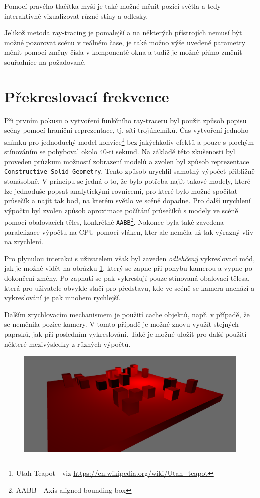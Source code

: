 \documentclass[12pt,a4paper,titlepage,final]{report}
\begin{document}
Pomocí pravého tlačítka myši je také možné měnit pozici světla a tedy interaktivně vizualizovat různé stíny a odlesky.

Jelikož metoda ray-tracing je pomalejší a na některých přístrojích nemusí být možné pozorovat scénu v reálném čase, je také možno výše uvedené parametry měnit pomocí změny čísla v komponentě okna a tudíž je možné přímo změnit souřadnice na požadované.

\section{Překreslovací frekvence}
\label{prvni_pokus}
Při prvním pokusu o vytvoření funkčního ray-traceru byl použit způsob popisu scény pomocí hraniční reprezentace, tj. síti trojúhelníků. Čas vytvoření jednoho snímku pro jednoduchý model konvice\footnote{Utah Teapot - viz \url{https://en.wikipedia.org/wiki/Utah_teapot}} bez jakýchkoliv efektů a pouze s plochým stínováním se pohyboval okolo 40-ti sekund. Na základě této zkušenosti byl proveden průzkum možností zobrazení modelů a zvolen byl způsob reprezentace \texttt{Constructive Solid Geometry}. Tento způsob urychlil samotný výpočet přibližně stonásobně. V principu se jedná o to, že bylo potřeba najít takové modely, které lze jednoduše popsat analytickými rovnicemi, pro které bylo možné spočítat průsečík a najít tak bod, na kterém světlo ve scéně dopadne. Pro další urychlení výpočtu byl zvolen způsob aproximace počítání průsečíků s modely ve scéně pomocí obalovacích těles, konkrétně \texttt{AABB}\footnote{AABB - Axis-aligned bounding box}. Nakonec byla také zavedena paralelizace výpočtu na CPU pomocí vláken, kter ale neměla už tak výrazný vliv na zrychlení.

Pro plynulou interakci s uživatelem však byl zaveden \emph{odlehčený} vykreslovací mód, jak je možné vidět na obrázku \ref{camera}, který se zapne při pohybu kamerou a vypne po dokončení změny. Po zapnutí se pak vykreslují pouze stínovaná obalovací tělesa, která pro uživatele obvykle stačí pro představu, kde ve scéně se kamera nachází a vykreslování je pak mnohem rychlejší. 

Dalším zrychlovacím mechanismem je použití cache objektů, např. v případě, že se neměnila pozice kamery. V tomto případě je možné znovu využít stejných paprsků, jak při posledním vykreslování. Také je možné uložit pro další použití některé mezivýsledky z různých výpočtů.

\begin{figure}[H]
	\centering
	\captionsetup{type=figure}
	\includegraphics[width=0.8\linewidth]{images/camera.png}
	\label{camera}
\end{figure}
\end{document}
